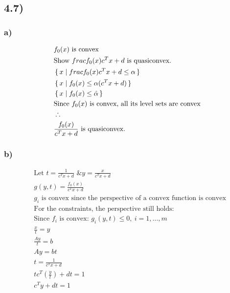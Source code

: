 \documentclass[12pt]{article}
\begin{document}
\subsection*{4.7)}

\subsubsection*{a)}

\begin{equation*}
\begin{aligned}
& f_0(x) \text{ is convex}\\
& \text{Show } frac{f_0(x)}{c^Tx +d} \text{ is quasiconvex.}\\
& \set{x | frac{f_0(x)}{c^Tx +d} \le \alpha}\\
& \set{x | f_0(x) \le \alpha(c^Tx +d)}\\
& \set{x | f_0(x) \le \hat{\alpha}}\\
& \text{Since $f_0(x)$ is convex, all its level sets are convex}\\
& \therefore\\
& \frac{f_0(x)}{c^Tx +d} \text{ is quasiconvex.}\\
\end{aligned}
\end{equation*}

\subsubsection*{b)}

\begin{equation*}
\begin{aligned}
& \text{Let } t = \frac{1}{c^Tx +d} \text{ \& } y = \frac{x}{c^Tx +d} \\
& g(y,t) = \frac{f_0(x)}{c^Tx + d}\\
& \text{$g_i$ is convex since the perspective of a convex function is convex}\\
& \text{For the constraints, the perspective still holds: }\\
& \text{Since $f_i$ is convex: } g_i(y,t) \le 0,\ i= 1,\dots,m\\
& \frac{x}{t} = y\\
& \frac{Ay}{t} = b\\
& Ay = bt\\
& t = \frac{1}{c^Tx + d}\\
& tc^T(\frac{y}{t}) + dt = 1\\
& c^Ty + dt = 1
\end{aligned}
\end{equation*}
\end{document}
